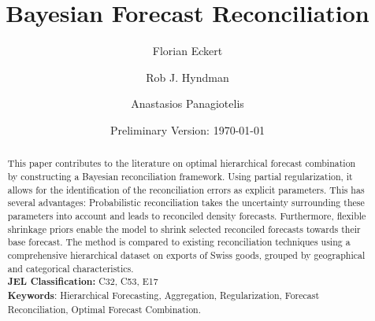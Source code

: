 


\title{\huge Bayesian Forecast Reconciliation}

\author[$\dagger$]{Florian Eckert}
\author[$\ddagger$]{Rob J. Hyndman}
\author[$\ddagger$]{Anastasios Panagiotelis}
\date{Preliminary Version: \today}

\maketitle
\begin{abstract}
This paper contributes to the literature on optimal hierarchical forecast combination by constructing a Bayesian reconciliation framework. Using partial regularization, it allows for the identification of the reconciliation errors as explicit parameters. This has several advantages: Probabilistic reconciliation takes the uncertainty surrounding these parameters into account and leads to reconciled density forecasts. Furthermore, flexible shrinkage priors enable the model to shrink selected reconciled forecasts towards their base forecast. The method is compared to existing reconciliation techniques using a comprehensive hierarchical dataset on exports of Swiss goods, grouped by geographical and categorical characteristics.\\

\noindent \textbf{JEL Classification:} C32, C53, E17 \\
\noindent \textbf{Keywords}: Hierarchical Forecasting, Aggregation, Regularization, Forecast Reconciliation, Optimal Forecast Combination.
\end{abstract}
\clearpage




\tableofcontents

\clearpage

\listoffigures
\listoftables

\clearpage


